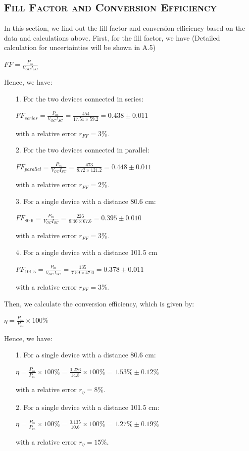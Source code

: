 \documentclass[a4paper,12pt]{article}
\begin{document}
\subsection{\textsc{Fill Factor and Conversion Efficiency}}
In this section, we find out the fill factor and conversion efficiency based on the data and calculations above. First, for the fill factor, we have (Detailed calculation for uncertainties will be shown in A.5)
\begin{center}
$\displaystyle FF = \frac{P_m}{V_{OC}I_{SC}} $
\end{center}
Hence, we have:
\begin{itemize}
\item[1.] For the two devices connected in series:
			\begin{center}
			$\displaystyle FF_{series} = \frac{P_m}{V_{OC}I_{SC}} = \frac{454}{17.51\times 59.2} = 0.438 \pm 0.011 $
			\end{center}
			with a relative error $r_{FF} = 3 \%$. 
\item[2.] For the two devices connected in parallel:
			\begin{center}
			$\displaystyle FF_{parallel} = \frac{P_m}{V_{OC}I_{SC}} = \frac{473}{8.72\times 121.2} = 0.448 \pm 0.011 $
			\end{center}
			with a relative error $r_{FF} = 2 \%$. 
\item[3.] For a single device with a distance 80.6 cm:
			\begin{center}
			$\displaystyle FF_{80.6} = \frac{P_m}{V_{OC}I_{SC}} = \frac{226}{8.46\times 67.6} = 0.395 \pm 0.010 $
			\end{center}
			with a relative error $r_{FF} = 3 \%$. 
\item[4.] For a single device with a distance 101.5 cm
			\begin{center}
			$\displaystyle FF_{101.5} = \frac{P_m}{V_{OC}I_{SC}} = \frac{135}{7.59\times 47.0} = 0.378 \pm 0.011 $
			\end{center}
			with a relative error $r_{FF} = 3 \%$. 
\end{itemize}
\par Then, we calculate the conversion efficiency, which is given by:
\begin{center}
$\displaystyle \eta = \frac{P_m}{P_{in}}\times 100\%$
\end{center}
Hence, we have:
\begin{itemize}
\item[1.] For a single device with a distance 80.6 cm:
			\begin{center}
			$\displaystyle \eta = \frac{P_m}{P_{in}}\times 100\% = \frac{0.226}{14.8}\times 100\% = 1.53\% \pm 0.12\% $
			\end{center}
			with a relative error $r_{\eta} = 8\%$.
\item[2.] For a single device with a distance 101.5 cm:
			\begin{center}
			$\displaystyle \eta = \frac{P_m}{P_{in}}\times 100\% = \frac{0.135}{10.6}\times 100\% = 1.27\% \pm 0.19\% $
			\end{center}			
			with a relative error $r_{\eta} = 15\%$.
\end{itemize}
\end{document}
